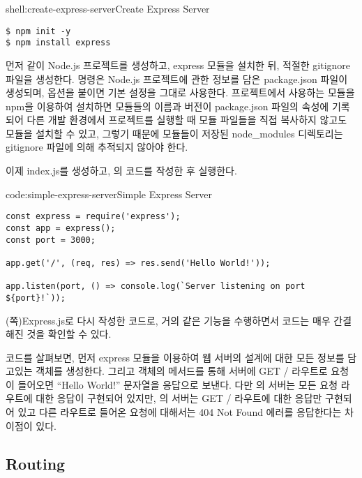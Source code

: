 \begin{shellenv}{shell:create-express-server}{Create Express Server}\begin{verbatim}
$ npm init -y
$ npm install express
\end{verbatim}
\end{shellenv}

먼저 \와 같이 Node.js 프로젝트를 생성하고, express 모듈을 설치한 뒤, 적절한 gitignore 파일을 생성한다.  명령은 Node.js 프로젝트에 관한 정보를 담은 package.json 파일이 생성되며,  옵션을 붙이면 기본 설정을 그대로 사용한다. 프로젝트에서 사용하는 모듈을 npm을 이용하여 설치하면 모듈들의 이름과 버전이 package.json 파일의  속성에 기록되어 다른 개발 환경에서 프로젝트를 실행할 때 모듈 파일들을 직접 복사하지 않고도 모듈을 설치할 수 있고, 그렇기 때문에 모듈들이 저장된 node\_modules 디렉토리는 gitignore 파일에 의해 추적되지 않아야 한다.

이제 index.js를 생성하고, 의 코드를 작성한 후 실행한다.

\begin{codeenv}{code:simple-express-server}{Simple Express Server}\begin{verbatim}
const express = require('express');
const app = express();
const port = 3000;

app.get('/', (req, res) => res.send('Hello World!'));

app.listen(port, () => console.log(`Server listening on port ${port}!`));
\end{verbatim}
\end{codeenv}

\는 (\pageref{code:nodejs-simple-web-server}쪽)\를 Express.js로 다시 작성한 코드로, 거의 같은 기능을 수행하면서 코드는 매우 간결해진 것을 확인할 수 있다.

코드를 살펴보면, 먼저 express 모듈을 이용하여 웹 서버의 설계에 대한 모든 정보를 담고있는  객체를 생성한다. 그리고  객체의  메서드를 통해 서버에 GET / 라우트로 요청이 들어오면 ``Hello World!'' 문자열을 응답으로 보낸다. 다만 의 서버는 모든 요청 라우트에 대한 응답이 구현되어 있지만, 의 서버는 GET / 라우트에 대한 응답만 구현되어 있고 다른 라우트로 들어온 요청에 대해서는 404 Not Found 에러를 응답한다는 차이점이 있다.

\subsection*{Routing}

